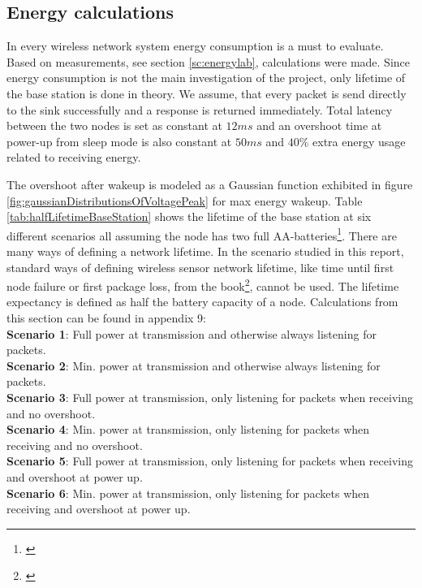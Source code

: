 \subsection{Energy calculations}\label{sc:energyCalculations}

In every wireless network system energy consumption is a must to evaluate. Based on measurements, see section \ref{sc:energylab}, calculations were made. Since energy consumption is not the main investigation of the project, only lifetime of the base station is done in theory. We assume, that every packet is send directly to the sink successfully and a response is returned immediately. Total latency between the two nodes is set as constant at $12 ms$ and an overshoot time at power-up from sleep mode is also constant at $50 ms$ and $40\%$ extra energy usage related to receiving energy.

\noindent The overshoot after wakeup is modeled as a Gaussian function exhibited in figure \ref{fig:gaussianDistributionsOfVoltagePeak} for max energy wakeup. Table \ref{tab:halfLifetimeBaseStation} shows the lifetime of the base station at six different scenarios all assuming the node has two full AA-batteries\footnote{\cite{Wikipedia20180528at1231}}. There are many ways of defining a network lifetime. In the scenario studied in this report, standard ways of defining wireless sensor network lifetime, like time until first node failure or first package loss, from the book\footnote{\cite[p.~65]{Karl2006}}, cannot be used. The lifetime expectancy is defined as half the battery capacity of a node. Calculations from this section can be found in appendix 9: \\

\noindent \textbf{Scenario 1}: Full power at transmission and otherwise always listening for packets.\\
\textbf{Scenario 2}: Min. power at transmission and otherwise always listening for packets.\\
\textbf{Scenario 3}: Full power at transmission, only listening for packets when receiving and no overshoot.\\
\textbf{Scenario 4}: Min. power at transmission, only listening for packets when receiving and no overshoot.\\
\textbf{Scenario 5}: Full power at transmission, only listening for packets when receiving and overshoot at power up.\\
\textbf{Scenario 6}: Min. power at transmission, only listening for packets when receiving and overshoot at power up.\\

